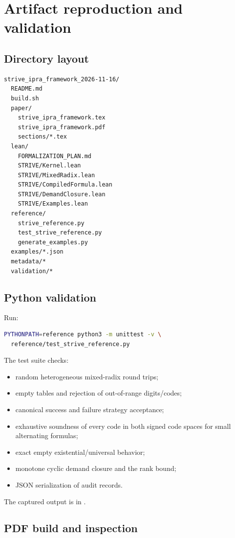 \section{Artifact reproduction and validation}

\subsection{Directory layout}

\begin{lstlisting}[language={}]
strive_ipra_framework_2026-11-16/
  README.md
  build.sh
  paper/
    strive_ipra_framework.tex
    strive_ipra_framework.pdf
    sections/*.tex
  lean/
    FORMALIZATION_PLAN.md
    STRIVE/Kernel.lean
    STRIVE/MixedRadix.lean
    STRIVE/CompiledFormula.lean
    STRIVE/DemandClosure.lean
    STRIVE/Examples.lean
  reference/
    strive_reference.py
    test_strive_reference.py
    generate_examples.py
  examples/*.json
  metadata/*
  validation/*
\end{lstlisting}

\subsection{Python validation}

Run:
\begin{lstlisting}[language=bash]
PYTHONPATH=reference python3 -m unittest -v \
  reference/test_strive_reference.py
\end{lstlisting}
The test suite checks:

\begin{itemize}
\item random heterogeneous mixed-radix round trips;
\item empty tables and rejection of out-of-range digits/codes;
\item canonical success and failure strategy acceptance;
\item exhaustive soundness of every code in both signed code spaces for small
alternating formulas;
\item exact empty existential/universal behavior;
\item monotone cyclic demand closure and the rank bound;
\item JSON serialization of audit records.
\end{itemize}

The captured output is in .

\subsection{PDF build and inspection}

